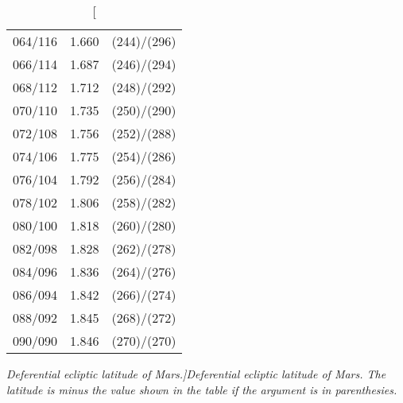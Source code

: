 \begin{table}
{\begin{tabular}{crc}
064/116 &  1.660 & (244)/(296)\\
066/114 &  1.687 & (246)/(294)\\
068/112 &  1.712 & (248)/(292)\\
070/110 &  1.735 & (250)/(290)\\
072/108 &  1.756 & (252)/(288)\\
074/106 &  1.775 & (254)/(286)\\
076/104 &  1.792 & (256)/(284)\\
078/102 &  1.806 & (258)/(282)\\
080/100 &  1.818 & (260)/(280)\\
082/098 &  1.828 & (262)/(278)\\
084/096 &  1.836 & (264)/(276)\\
086/094 &  1.842 & (266)/(274)\\
088/092 &  1.845 & (268)/(272)\\
090/090 &  1.846 & (270)/(270)\\
\end{tabular}}
\caption[\em Deferential ecliptic latitude of Mars.]{\em Deferential ecliptic latitude of Mars.  The latitude is minus the value shown
in the table if the argument is
in parenthesies. }\label{tlat1m}
\end{table}

